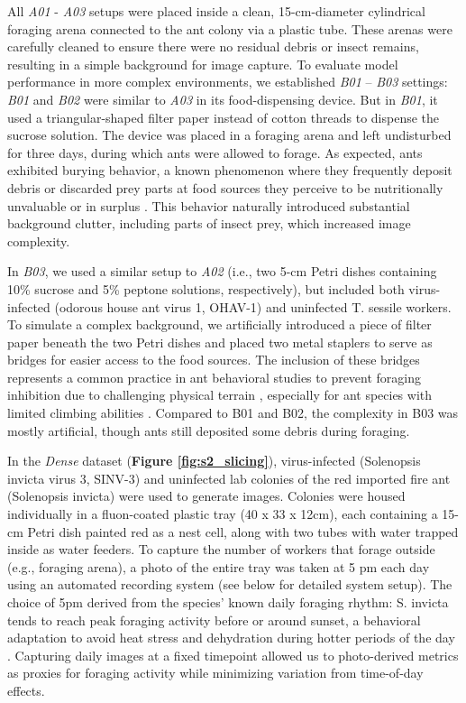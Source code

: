 All \textit{A01} - \textit{A03} setups were placed inside a clean, 15-cm-diameter cylindrical foraging arena connected to the ant colony via a plastic tube. These arenas were carefully cleaned to ensure there were no residual debris or insect remains, resulting in a simple background for image capture. 
To evaluate model performance in more complex environments, we established \textit{B01} – \textit{B03} settings: \textit{B01} and \textit{B02} were similar to \textit{A03} in its food-dispensing device. But in \textit{B01}, it used a triangular-shaped filter paper instead of cotton threads to dispense the sucrose solution. The device was placed in a foraging arena and left undisturbed for three days, during which ants were allowed to forage. As expected, ants exhibited burying behavior, a known phenomenon where they frequently deposit debris or discarded prey parts at food sources they perceive to be nutritionally unvaluable or in surplus \cite{qin_food-burying_2019}. This behavior naturally introduced substantial background clutter, including parts of insect prey, which increased image complexity. 

In \textit{B03}, we used a similar setup to \textit{A02} (i.e., two 5-cm Petri dishes containing 10\% sucrose and 5\% peptone solutions, respectively), but included both virus-infected (odorous house ant virus 1, OHAV-1) and uninfected T. sessile workers. To simulate a complex background, we artificially introduced a piece of filter paper beneath the two Petri dishes and placed two metal staplers to serve as bridges for easier access to the food sources. The inclusion of these bridges represents a common practice in ant behavioral studies to prevent foraging inhibition due to challenging physical terrain \cite{czaczkes_ant_2013}, especially for ant species with limited climbing abilities \cite{billen_pretarsus_2017}. Compared to B01 and B02, the complexity in B03 was mostly artificial, though ants still deposited some debris during foraging. 

In the \textit{Dense} dataset (\textbf{Figure \ref{fig:s2_slicing}}), virus-infected (Solenopsis invicta virus 3, SINV-3) and uninfected lab colonies of the red imported fire ant (Solenopsis invicta) were used to generate images. Colonies were housed individually in a fluon-coated plastic tray (40 x 33 x 12cm), each containing a 15-cm Petri dish painted red as a nest cell, along with two tubes with water trapped inside as water feeders. To capture the number of workers that forage outside (e.g., foraging arena), a photo of the entire tray was taken at 5 pm each day using an automated recording system (see below for detailed system setup). The choice of 5pm derived from the species’ known daily foraging rhythm: S. invicta tends to reach peak foraging activity before or around sunset, a behavioral adaptation to avoid heat stress and dehydration during hotter periods of the day \cite{lei_rhythms_2019, das_biological_2023}. Capturing daily images at a fixed timepoint allowed us to photo-derived metrics as proxies for foraging activity while minimizing variation from time-of-day effects.

